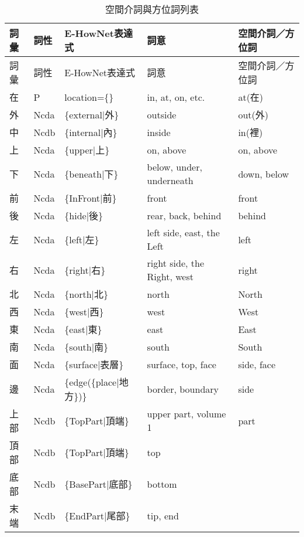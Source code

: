 {\footnotesize
\renewcommand{\arraystretch}{0.8}
\begin{longtable}{
  >{\centering\arraybackslash}m{1cm} %
  >{\centering\arraybackslash}m{1cm} %
  >{\arraybackslash}m{6cm}            %
  >{\arraybackslash}m{3cm}            %
  >{\arraybackslash}m{2cm}            %
}
\caption{空間介詞與方位詞列表} \label{tab:wordList} \\
\toprule
詞彙 & 詞性 & E-HowNet表達式 & 詞意 & 空間介詞／方位詞 \\
\toprule
\endfirsthead
\toprule
詞彙 & 詞性 & E-HowNet表達式 & 詞意 & 空間介詞／方位詞 \\
\toprule
\endhead
\bottomrule
\endlastfoot
在 & P & location=\{\} & in, at, on, etc. & at(在) \\ \hline
外 & Ncda & \{external|外\} & outside & out(外) \\ \hline
中 & Ncdb & \{internal|內\} & inside & in(裡) \\ \hline
上 & Ncda & \{upper|上\} & on, above & on, above \\ \hline
下 & Ncda & \{beneath|下\} & below, under, underneath & down, below \\ \hline
前 & Ncda & \{InFront|前\} & front & front \\ \hline
後 & Ncda & \{hide|後\} & rear, back, behind & behind \\ \hline
左 & Ncda & \{left|左\} & left side, east, the Left & left \\ \hline
右 & Ncda & \{right|右\} & right side, the Right, west & right \\ \hline
北 & Ncda & \{north|北\} & north & North \\ \hline
西 & Ncda & \{west|西\} & west & West \\ \hline
東 & Ncda & \{east|東\} & east & East \\ \hline
南 & Ncda & \{south|南\} & south & South \\ \hline
面 & Ncda & \{surface|表層\} & surface, top, face & side, face \\ \hline
邊 & Ncda & \{edge(\{place|地方\})\} & border, boundary & side \\ \hline
上部 & Ncdb & \{TopPart|頂端\} & upper part, volume 1 & part \\ \hline
頂部 & Ncdb & \{TopPart|頂端\} & top & \\ \hline
底部 & Ncdb & \{BasePart|底部\} & bottom & \\ \hline
末端 & Ncdb & \{EndPart|尾部\} & tip, end & \\ \hline

\end{longtable}}
